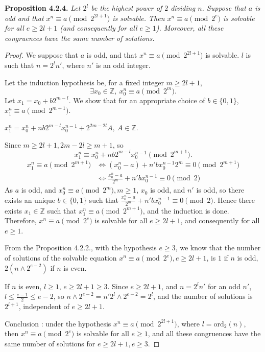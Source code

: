 \documentclass[11pt,a4paper]{article}
\newcommand{\Z}{\mathbb{Z}}
\begin{document}
\bigskip
{\bf Proposition 4.2.4.} 
{\it Let $2^l$ be the highest power of $2$ dividing $n$. Suppose that $a$ is odd and that $x^n \equiv a \pmod {2^{2l+1}}$ is solvable. Then $x^n \equiv a \pmod{2^e}$ is solvable for all $e\geq 2l+1$ (and consequently for all $e\geq 1$). Moreover, all these congruences have the same number of solutions.
}
\begin{proof}
We suppose that $a$ is odd, and that $x^n\equiv a \pmod {2^{2l+1}}$ is solvable. $l$ is such that $n = 2^l n'$, where $n'$ is an odd integer.

Let the induction hypothesis  be, for a fixed integer $m\geq 2l+1$,
$$\exists x_0 \in \Z,\  x_0^n\equiv a \pmod{2^m}.$$
Let $x_1 = x_0 + b 2^{m-l}$. We show that for an appropriate choice of $b\in \{0,1\}$,  $x_1^n \equiv a \pmod {2^{m+1}}$.

$x_1^n = x_0^n + nb2^{m-l}x_0^{n-1} + 2^{2m-2l} A,\  A \in \Z$.

Since $m\geq 2l+1, 2m-2l \geq m+1$, so
$$x_1^n \equiv x_0^n + nb2^{m-l}x_0^{n-1} \pmod {2^{m+1}}.$$
\begin{align*}
x_1^n \equiv a \pmod {2^{m+1}} &\iff (x_0^n -a) + n' b x_0^{n-1} 2^m \equiv 0 \pmod {2^{m+1}}\\
&\iff\frac{x_0^n - a}{2^m} + n' b x_0^{n-1} \equiv 0 \pmod 2
\end{align*}
As $a$ is odd, and  $x_0^n \equiv a \pmod {2^m}, m\geq 1$, $x_0$ is odd, and $n'$ is odd, so there exists an unique $b \in \{0,1\}$ such that $\frac{x_0^n - a}{2^m} + n' b x_0^{n-1} \equiv 0 \pmod 2$. Hence there exists $x_1 \in \Z$ such that $x_1^n \equiv a \pmod {2^{m+1}}$, and the induction is done. Therefore, $x^n \equiv a \pmod{2^e}$ is solvable for all $e\geq 2l+1$, and consequently for all $e\geq 1$. 

\bigskip

From the Proposition 4.2.2., with the hypothesis $e\geq 3$,  we know that the number of solutions of the solvable equation $x^n \equiv a \pmod {2^e}, e\geq 2l+1$,  is $1$ if $n$ is odd, $2(n\wedge 2^{e-2})$ if $n$ is even.

If $n$ is even, $l\geq 1$, $e \geq 2l+1 \geq 3$.
Since $e\geq 2l+1$, and $n = 2^l n'$ for an odd $n'$, $l\leq \frac{e-1}{2} \leq e-2$, so $n \wedge 2^{e-2} = n'2^{l} \wedge 2^{e-2}= 2^l$, and the number of solutions is $2^{l+1}$, independent of $e\geq 2l+1$.

Conclusion : under the hypothesis $x^n \equiv a \pmod {2^{2l+1}}$, where $l = \mathrm{ord}_2(n)$, then $x^n \equiv a \pmod {2^e}$ is solvable for all $e\geq 1$, and all these congruences have the same number of solutions for $e\geq 2l+1, e\geq 3$.
\end{proof}
\end{document}
